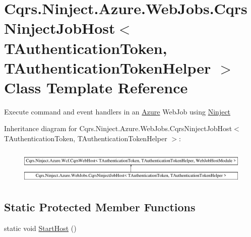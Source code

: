 \hypertarget{classCqrs_1_1Ninject_1_1Azure_1_1WebJobs_1_1CqrsNinjectJobHost}{}\section{Cqrs.\+Ninject.\+Azure.\+Web\+Jobs.\+Cqrs\+Ninject\+Job\+Host$<$ T\+Authentication\+Token, T\+Authentication\+Token\+Helper $>$ Class Template Reference}
\label{classCqrs_1_1Ninject_1_1Azure_1_1WebJobs_1_1CqrsNinjectJobHost}


Execute command and event handlers in an \hyperlink{namespaceCqrs_1_1Ninject_1_1Azure}{Azure} Web\+Job using \hyperlink{namespaceCqrs_1_1Ninject}{Ninject}  


Inheritance diagram for Cqrs.\+Ninject.\+Azure.\+Web\+Jobs.\+Cqrs\+Ninject\+Job\+Host$<$ T\+Authentication\+Token, T\+Authentication\+Token\+Helper $>$\+:\begin{figure}[H]
\begin{center}
\leavevmode
\includegraphics[height=1.676647cm]{classCqrs_1_1Ninject_1_1Azure_1_1WebJobs_1_1CqrsNinjectJobHost}
\end{center}
\end{figure}
\subsection*{Static Protected Member Functions}
\begin{DoxyCompactItemize}
\item 
static void \hyperlink{classCqrs_1_1Ninject_1_1Azure_1_1WebJobs_1_1CqrsNinjectJobHost_a9b7fb1deadaf625c21f1d7d55cd5752f_a9b7fb1deadaf625c21f1d7d55cd5752f}{Start\+Host} ()
\end{DoxyCompactItemize}
